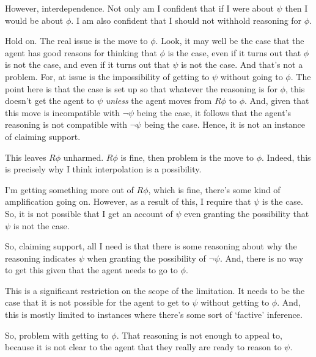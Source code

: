 \begin{note}
  However, interdependence.
  Not only am I confident that if I were \misled{} about \(\psi\) then I would be \misled{} about \(\phi\).
  I am also confident that I should not withhold reasoning for \(\phi\).

  {
    \color{red}
    Hold on.
    The real issue is the move to \(\phi\).
    Look, it may well be the case that the agent has good reasons for thinking that \(\phi\) is the case, even if it turns out that \(\phi\) is not the case, and even if it turns out that \(\psi\) is not the case.
    And that's not a problem.
    For, at issue is the impossibility of getting to \(\psi\) without going to \(\phi\).
    The point here is that the case is set up so that whatever the reasoning is for \(\phi\), this doesn't get the agent to \(\psi\) \emph{unless} the agent moves from \(R\phi\) to \(\phi\).
    And, given that this move is incompatible with \(\lnot\psi\) being the case, it follows that the agent's reasoning is not compatible with \(\lnot\psi\) being the case.
    Hence, it is not an instance of claiming support.

    This leaves \(R\phi\) unharmed.
    \(R\phi\) is fine, then problem is the move to \(\phi\).
    Indeed, this is precisely why I think interpolation is a possibility.

    I'm getting something more out of \(R\phi\), which is fine, there's some kind of amplification going on.
    However, as a result of this, I require that \(\psi\) is the case.
    So, it is not possible that I get an account of \(\psi\) even granting the possibility that \(\psi\) is not the case.

    So, claiming support, all I need is that there is some reasoning about why the reasoning indicates \(\psi\) when granting the possibility of \(\lnot\psi\).
    And, there is no way to get this given that the agent needs to go to \(\phi\).

    This is a significant restriction on the scope of the limitation.
    It needs to be the case that it is not possible for the agent to get to \(\psi\) without getting to \(\phi\).
    And, this is mostly limited to instances where there's some sort of `factive' inference.
  }


  So, problem with getting to \(\phi\).
  That reasoning is not enough to appeal to, because it is not clear to the agent that they really are ready to reason to \(\psi\).
\end{note}





